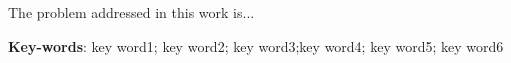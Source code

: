  
The problem addressed in this work is...
 
\noindent \textbf{Key-words}: key word1; key word2; key word3;key word4; key word5; key word6